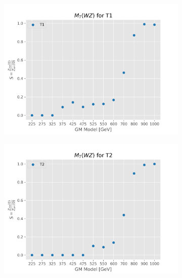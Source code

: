 \documentclass[../Bachelorarbeit.tex]{subfiles}
\begin{document}
\begin{figure}[h]
\begin{subfigure}{0.45\textwidth}
        \includegraphics[width=\textwidth]{Plots/gm_relevanze/MTWZ_op_T1.png}
        \caption{}
    \end{subfigure}
    \begin{subfigure}{0.45\textwidth}
        \includegraphics[width=\textwidth]{Plots/gm_relevanze/MTWZ_op_T2.png}
        \caption{}
    \end{subfigure}
    \caption{}
\end{figure}
\end{document}
